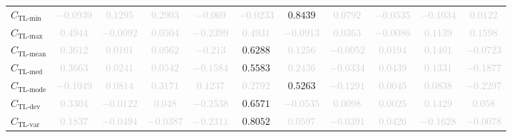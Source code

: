 \documentclass{standalone}
\newcommand{\tlminname}{\text{TL-min}}
\newcommand{\tlmin}{C_{\tlminname}}
\newcommand{\tlavgname}{\text{TL-mean}}
\newcommand{\tlavg}{C_{\tlavgname}}
\newcommand{\tlmaxname}{\text{TL-max}}
\newcommand{\tlmax}{C_{\tlmaxname}}
\newcommand{\tlmedname}{\text{TL-med}}
\newcommand{\tlmed}{C_{\tlmedname}}
\newcommand{\tlmodename}{\text{TL-mode}}
\newcommand{\tlmode}{C_{\tlmodename}}
\newcommand{\tldevname}{\text{TL-dev}}
\newcommand{\tldev}{C_{\tldevname}}
\newcommand{\tlvarname}{\text{TL-var}}
\newcommand{\tlvar}{C_{\tlvarname}}
\begin{document}
\begin{tabular}{lcccccccccc}
$\tlmin$ & \textcolor{lightgray}{$-0.0939$} & \textcolor{lightgray}{$0.1295$} & \textcolor{lightgray}{$0.2903$} & \textcolor{lightgray}{$-0.069$} & \textcolor{lightgray}{$-0.0233$} & $0.8439$ & \textcolor{lightgray}{$0.0792$} & \textcolor{lightgray}{$-0.0535$} & \textcolor{lightgray}{$-0.1034$} & \textcolor{lightgray}{$0.0122$} \\ 
$\tlmax$ & \textcolor{lightgray}{$0.4944$} & \textcolor{lightgray}{$-0.0092$} & \textcolor{lightgray}{$0.0504$} & \textcolor{lightgray}{$-0.2399$} & \textcolor{lightgray}{$0.4931$} & \textcolor{lightgray}{$-0.0913$} & \textcolor{lightgray}{$0.0363$} & \textcolor{lightgray}{$-0.0086$} & \textcolor{lightgray}{$0.1139$} & \textcolor{lightgray}{$0.1598$} \\ 
$\tlavg$ & \textcolor{lightgray}{$0.3612$} & \textcolor{lightgray}{$0.0101$} & \textcolor{lightgray}{$0.0562$} & \textcolor{lightgray}{$-0.213$} & $0.6288$ & \textcolor{lightgray}{$0.1256$} & \textcolor{lightgray}{$-0.0052$} & \textcolor{lightgray}{$0.0194$} & \textcolor{lightgray}{$0.1401$} & \textcolor{lightgray}{$-0.0723$} \\ 
$\tlmed$ & \textcolor{lightgray}{$0.3663$} & \textcolor{lightgray}{$0.0241$} & \textcolor{lightgray}{$0.0542$} & \textcolor{lightgray}{$-0.1584$} & $0.5583$ & \textcolor{lightgray}{$0.2436$} & \textcolor{lightgray}{$-0.0334$} & \textcolor{lightgray}{$0.0439$} & \textcolor{lightgray}{$0.1331$} & \textcolor{lightgray}{$-0.1877$} \\ 
$\tlmode$ & \textcolor{lightgray}{$-0.1049$} & \textcolor{lightgray}{$0.0814$} & \textcolor{lightgray}{$0.3171$} & \textcolor{lightgray}{$0.1237$} & \textcolor{lightgray}{$0.2792$} & $0.5263$ & \textcolor{lightgray}{$-0.1291$} & \textcolor{lightgray}{$0.0045$} & \textcolor{lightgray}{$0.0838$} & \textcolor{lightgray}{$-0.2297$} \\ 
$\tldev$ & \textcolor{lightgray}{$0.3304$} & \textcolor{lightgray}{$-0.0122$} & \textcolor{lightgray}{$0.048$} & \textcolor{lightgray}{$-0.2538$} & $0.6571$ & \textcolor{lightgray}{$-0.0535$} & \textcolor{lightgray}{$0.0098$} & \textcolor{lightgray}{$0.0025$} & \textcolor{lightgray}{$0.1429$} & \textcolor{lightgray}{$0.058$} \\ 
$\tlvar$ & \textcolor{lightgray}{$0.1837$} & \textcolor{lightgray}{$-0.0494$} & \textcolor{lightgray}{$-0.0387$} & \textcolor{lightgray}{$-0.2311$} & $0.8052$ & \textcolor{lightgray}{$0.0597$} & \textcolor{lightgray}{$-0.0391$} & \textcolor{lightgray}{$0.0426$} & \textcolor{lightgray}{$-0.1628$} & \textcolor{lightgray}{$-0.0078$} \\ 

\end{tabular}
\end{document}
